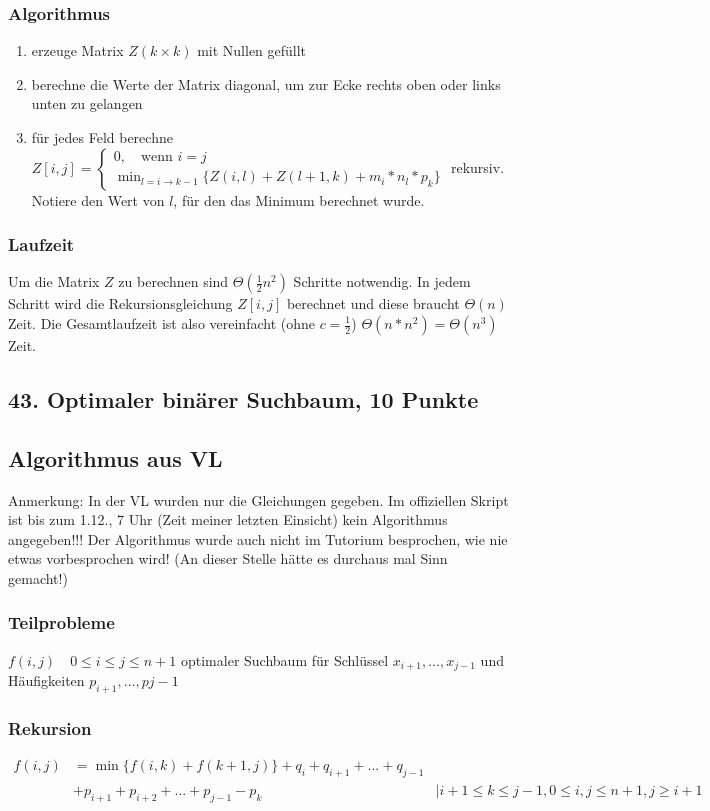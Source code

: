 \documentclass[ngerman,a4paper]{report}
\begin{document}
\subsubsection*{Algorithmus}
\begin{enumerate}
\item erzeuge Matrix $Z (k \times k)$ mit Nullen gefüllt
\item berechne die Werte der Matrix diagonal, um zur Ecke rechts oben oder links unten zu gelangen 
\item für jedes Feld berechne $Z[i,j] = \begin{cases} 0, \quad\text{wenn } i = j \\ \min_{l = i \rightarrow k-1}\{Z(i,l) + Z(l+1,k) + m_i * n_l * p_k \}\end{cases}$ rekursiv. Notiere den Wert von $l$, für den das Minimum berechnet wurde.
\end{enumerate}
\subsubsection*{Laufzeit}
Um die Matrix $Z$ zu berechnen sind $\Theta(\frac{1}{2}n^2)$ Schritte notwendig. In jedem Schritt wird die Rekursionsgleichung $Z[i,j]$ berechnet und diese braucht $\Theta(n)$ Zeit. Die Gesamtlaufzeit ist also vereinfacht (ohne $c=\frac{1}{2}$) $\Theta(n*n^2) = \Theta(n^3)$ Zeit.
\subsection*{43. Optimaler binärer Suchbaum, 10 Punkte}
\subsection*{Algorithmus aus VL}
Anmerkung: In der VL wurden nur die Gleichungen gegeben. Im offiziellen Skript ist bis zum 1.12., 7 Uhr (Zeit meiner letzten Einsicht) kein Algorithmus angegeben!!! Der Algorithmus wurde auch nicht im Tutorium besprochen, wie nie etwas vorbesprochen wird! (An dieser Stelle hätte es durchaus mal Sinn gemacht!)
\subsubsection*{Teilprobleme}
$f(i,j)\quad 0\leq i \leq j \leq n+1$ optimaler Suchbaum für Schlüssel $x_{i+1}, ... , x_{j-1}$ und Häufigkeiten $p_{i+1},...,p{j-1}$
\subsubsection*{Rekursion}
\begin{align*}
f(i,j) &= \min \{ f(i,k) + f(k+1,j)\} + q_i + q_{i+1} + ... + q_{j-1} \\&+ p_{i+1} + p_{i+2} + ... + p_{j-1} - p_{k} &| i+1\leq k \leq j-1, 0 \leq i, j \leq n+1, j \geq i+1\\
\end{align*}
\end{document}
